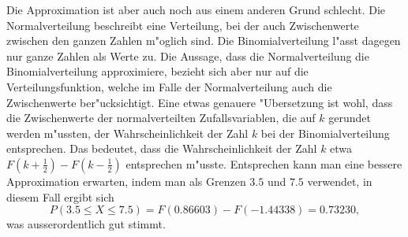 \begin{loesung}
\begin{teilaufgaben}
Die Approximation ist aber auch noch aus einem anderen Grund schlecht.
Die Normalverteilung beschreibt eine Verteilung, bei der auch Zwischenwerte
zwischen den ganzen Zahlen m"oglich sind. Die Binomialverteilung l"asst
dagegen nur ganze Zahlen als Werte zu. Die Aussage, dass die Normalverteilung
die Binomialverteilung approximiere, bezieht sich aber nur auf die
Verteilungsfunktion, welche im Falle der Normalverteilung auch die
Zwischenwerte ber"ucksichtigt. Eine etwas genauere "Ubersetzung
ist wohl, dass die Zwischenwerte der normalverteilten Zufallsvariablen,
die auf $k$ gerundet werden m"ussten, der Wahrscheinlichkeit der Zahl
$k$ bei der Binomialverteilung entsprechen. Das bedeutet, dass die
Wahrscheinlichkeit der Zahl $k$ etwa $F(k+\frac12)-F(k-\frac12)$
entsprechen m"usste.
Entsprechen kann man eine
bessere Approximation erwarten, indem man als Grenzen
$3.5$ und $7.5$ verwendet, in diesem Fall ergibt sich
\[
P(3.5\le X\le 7.5)=F(0.86603)-F(-1.44338)=0.73230,
\]
was ausserordentlich gut stimmt.
\end{teilaufgaben}
\end{loesung}

